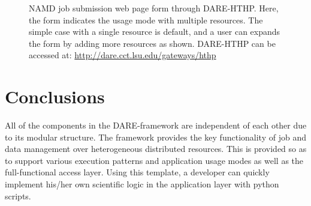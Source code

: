 \documentclass{sig-alternate}
\begin{document}
\begin{figure}
 \centering
\caption{\small NAMD job submission web page form through
  DARE-HTHP. Here, the form indicates the usage mode with multiple
  resources.  The simple case with a single resource is default, and a
  user can expands the form by adding more resources as shown.
  DARE-HTHP can be accessed at:
  \url{http://dare.cct.lsu.edu/gateways/hthp} }
  \label{fig:NAMD2}
\end{figure}


\section{Conclusions}

All of the components in the DARE-framework are independent of each
other due to its modular structure.  The framework provides the key
functionality of job and data management over heterogeneous
distributed resources. This is provided so as to support various
execution patterns and application usage modes as well as the
full-functional access layer.  Using this template, a developer can
quickly implement his/her own scientific logic in the application
layer with python scripts.
\end{document}

